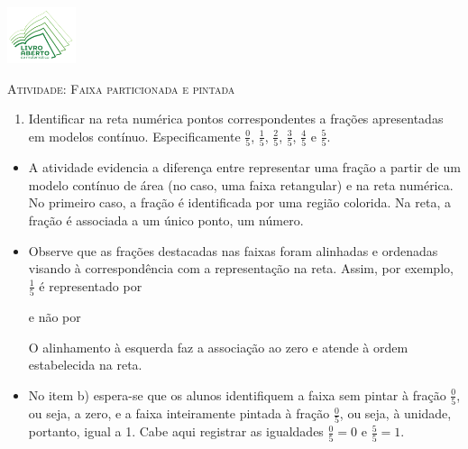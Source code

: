\documentclass[10 pt,usenames,dvipsnames, oneside]{article}
\begin{document}
\begin{center}
  \begin{minipage}[l]{3cm}
\includegraphics[width=2cm]{../../../Figuras/logo}       
\end{minipage}\hfill
\begin{minipage}[r]{.8\textwidth}
 {\Large \scshape Atividade: Faixa particionada e pintada}  
\end{minipage}
\end{center}
\vspace{.2cm}

\ifdefined\prof
\begin{goals}
\begin{enumerate}
\item Identificar na reta numérica pontos correspondentes a frações apresentadas em modelos contínuo. Especificamente    $\frac{0}{5}$,  $\frac{1}{5}$,       $\frac{2}{5}$,       $\frac{3}{5}$, $\frac{4}{5}$ e $\frac{5}{5}$.
\end{enumerate}

\tcblower

\begin{itemize}
\item A atividade evidencia a diferença entre representar uma fração a partir de um modelo contínuo de área (no caso, uma faixa retangular) e na reta numérica. No primeiro caso, a fração é identificada por uma região colorida. Na reta, a fração é associada a um único ponto, um número.
\item Observe que as frações destacadas nas faixas foram alinhadas e ordenadas visando à correspondência com a representação na reta.  Assim, por exemplo, $\frac{1}{5}$ é representado por
e não por       
O alinhamento à esquerda faz a associação ao zero e atende à ordem estabelecida na reta.
\item No item b) espera-se que os alunos identifiquem a faixa sem pintar à fração $\frac{0}{5}$, ou seja, a zero, e a faixa inteiramente pintada à fração $\frac{0}{5}$, ou seja, à unidade, portanto, igual a 1. Cabe aqui registrar as igualdades $\frac{0}{5}=0$ e $\frac{5}{5}=1$.

\end{itemize}
\end{goals}
\end{document}
